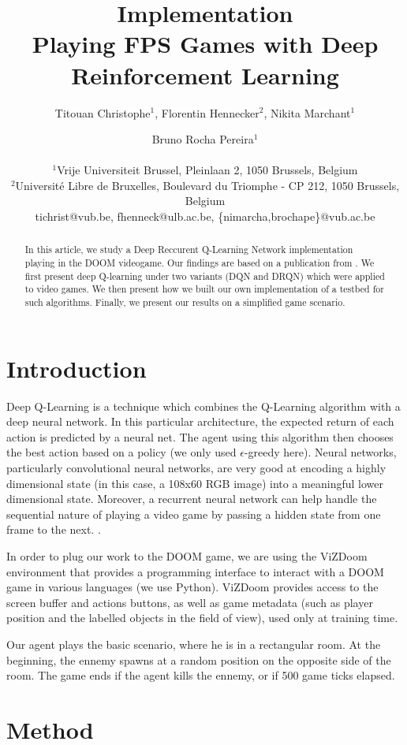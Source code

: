 \documentclass[letterpaper]{article}
\title{Implementation\\Playing FPS Games with Deep Reinforcement Learning}
\author{Titouan Christophe$^{1}$, Florentin Hennecker$^{2}$, Nikita Marchant$^{1}$ \and Bruno Rocha Pereira$^{1}$ \\
\mbox{}\\
$^1$Vrije Universiteit Brussel, Pleinlaan 2, 1050 Brussels, Belgium \\
$^2$Universit\'e Libre de Bruxelles, Boulevard du Triomphe - CP 212, 1050
Brussels, Belgium \\
tichrist@vub.be, fhenneck@ulb.ac.be, \{nimarcha,brochape\}@vub.ac.be}
\begin{document}
\maketitle

\begin{abstract}
In this article, we study a Deep Reccurent Q-Learning Network implementation
playing in the DOOM videogame. Our findings are based on a publication from
\cite{Lample2016}. We first present deep Q-learning under two variants (DQN and
DRQN) which were applied to video games. We then present how we built our own
implementation of a testbed for such algorithms. Finally, we present our results
on a simplified game scenario.
\end{abstract}

\section{Introduction}
Deep Q-Learning is a technique which combines the Q-Learning algorithm with
a deep neural network. In this particular architecture, the expected return of
each action is predicted by a neural net. The agent using this algorithm then
chooses the best action based on a policy (we only used $\epsilon$-greedy here).
Neural networks, particularly convolutional neural networks, are very good at
encoding a highly dimensional state (in this case, a 108x60 RGB image) into a
meaningful lower dimensional state. Moreover, a recurrent neural network can
help handle the sequential nature of playing a video game by passing a hidden
state from one frame to the next.
.

In order to plug our work to the DOOM game, we are using the ViZDoom environment
\citep{Kempka2016} that provides a programming interface to interact with a
DOOM game in various languages (we use Python). ViZDoom provides access to the
screen buffer and actions buttons, as well as game metadata (such as player
position and the labelled objects in the field of view), used only at training time.

Our agent plays the basic scenario, where he is in a rectangular room.
At the beginning, the ennemy spawns at a random position on the opposite side of
the room. The game ends if the agent kills the ennemy, or if 500 game ticks elapsed.

\section{Method}
\end{document}
